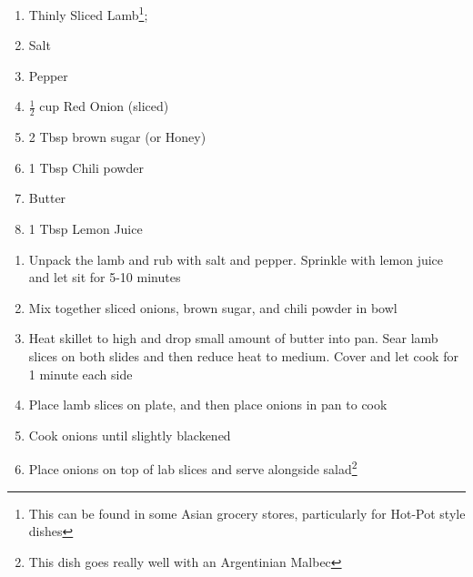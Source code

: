 \documentclass[oneside]{recipe}
\newcommand{\recipecolumn}[2]{
	\begin{multicols}{2}
	\raggedcolumns
	#1
	\columnbreak
	#2
	\end{multicols}
}
\begin{document}
\recipecolumn{
	\begin{enumerate}
	\item Thinly Sliced Lamb\footnote{This can be found in some Asian grocery stores, particularly for Hot-Pot style dishes};
	\item Salt
	\item Pepper
	\item $\frac{1}{2}$ cup Red Onion (sliced)
	\item 2 Tbsp brown sugar (or Honey)
	\item 1 Tbsp Chili powder 
	\item Butter
	\item 1 Tbsp Lemon Juice
	\end{enumerate}
}{
	\begin{enumerate}	
		\item Unpack the lamb and rub with salt and pepper. Sprinkle with lemon juice and let sit for 5-10 minutes
		\item Mix together sliced onions, brown sugar, and chili powder in bowl
		\item Heat skillet to high and drop small amount of butter into pan. Sear lamb slices on both slides and then reduce heat to medium. Cover and let cook for 1 minute each side 
		\item Place lamb slices on plate, and then place onions in pan to cook
		\item Cook onions until slightly blackened
		\item Place onions on top of lab slices and serve alongside salad\footnote{This dish goes really well with an Argentinian Malbec}
	\end{enumerate}
}
\end{document}
